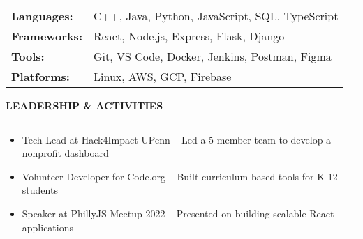 \documentclass[10pt, letterpaper]{article}
\newcommand{\sectiontitle}[1]{
  \vspace{0.5cm}
  {\Large\color{primary}\textbf{#1}}
  \vspace{0.2cm}\hrule
  \vspace{0.3cm}
}
\begin{document}
\begin{tabularx}{\textwidth}{@{}lX@{}}
  \textbf{Languages:} & C++, Java, Python, JavaScript, SQL, TypeScript \\
  \textbf{Frameworks:} & React, Node.js, Express, Flask, Django \\
  \textbf{Tools:} & Git, VS Code, Docker, Jenkins, Postman, Figma \\
  \textbf{Platforms:} & Linux, AWS, GCP, Firebase \\
\end{tabularx}

\sectiontitle{LEADERSHIP \& ACTIVITIES}

\begin{itemize}[leftmargin=*, nosep]
  \item Tech Lead at Hack4Impact UPenn – Led a 5-member team to develop a nonprofit dashboard
  \item Volunteer Developer for Code.org – Built curriculum-based tools for K-12 students
  \item Speaker at PhillyJS Meetup 2022 – Presented on building scalable React applications
\end{itemize}
\end{document}
